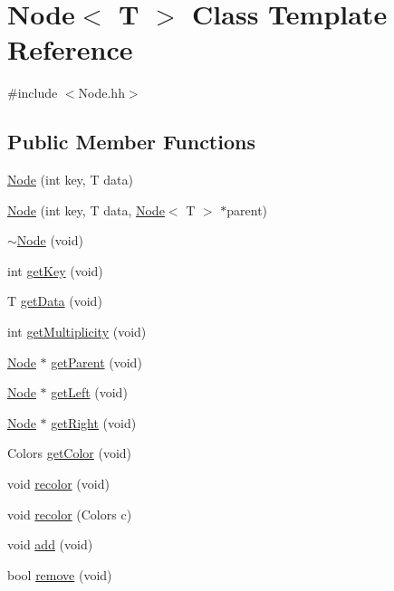 \hypertarget{class_node}{}\section{Node$<$ T $>$ Class Template Reference}
\label{class_node}


{\ttfamily \#include $<$Node.\+hh$>$}

\subsection*{Public Member Functions}
\begin{DoxyCompactItemize}
\item 
\hyperlink{class_node_a40d6e9db35a69683afc2a960f96c1109}{Node} (int key, T data)
\item 
\hyperlink{class_node_a2e3be75932d110fb2a52a3c297159f75}{Node} (int key, T data, \hyperlink{class_node}{Node}$<$ T $>$ $\ast$parent)
\item 
\hyperlink{class_node_a5fc413278a0bd22eb84e03c0ae90e22a}{$\sim$\+Node} (void)
\item 
int \hyperlink{class_node_a5ff3a3dd66edef87867616d1bc44838f}{get\+Key} (void)
\item 
T \hyperlink{class_node_ad89031c2899fe91646652ce4c2e79ab6}{get\+Data} (void)
\item 
int \hyperlink{class_node_ab83eb1cc81f91a5641693eb22712f8c8}{get\+Multiplicity} (void)
\item 
\hyperlink{class_node}{Node} $\ast$ \hyperlink{class_node_ad6543650b2b521ced0456014d0344e3c}{get\+Parent} (void)
\item 
\hyperlink{class_node}{Node} $\ast$ \hyperlink{class_node_a2ab0ff5c5d882b57577c077ee897397e}{get\+Left} (void)
\item 
\hyperlink{class_node}{Node} $\ast$ \hyperlink{class_node_a19f6f466f04ca1dc6a314b25c3d13c99}{get\+Right} (void)
\item 
Colors \hyperlink{class_node_a9c209bbcd6a8c1e07914a0c6bea3a6f4}{get\+Color} (void)
\item 
void \hyperlink{class_node_a431de433a18f187a322ff5fe3ce39c9c}{recolor} (void)
\item 
void \hyperlink{class_node_a28b5a3622c4379faa722995c1ba01ae4}{recolor} (Colors c)
\item 
void \hyperlink{class_node_aef85f7c8d30881449f35ac5fda836438}{add} (void)
\item 
bool \hyperlink{class_node_a2f77a48dceae8b8268826483f9671e1a}{remove} (void)
\item 

\end{DoxyCompactItemize}
